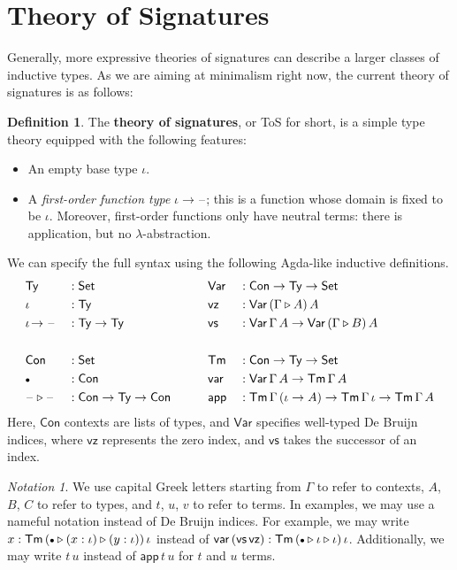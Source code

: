 \documentclass[12pt,a4paper,twoside,openany]{book}
\theoremstyle{remark}
\newtheorem{notation}{Notation}
\theoremstyle{definition}
\newtheorem{mydefinition}{Definition}
\theoremstyle{theorem}
\newcommand{\ms}[1]{\mathsf{#1}}
\newcommand{\Con}{\mathsf{Con}}
\newcommand{\Tm}{\mathsf{Tm}}
\newcommand{\Ty}{\mathsf{Ty}}
\newcommand{\blank}{\mathord{\hspace{1pt}\text{--}\hspace{1pt}}}
\newcommand{\Set}{\mathsf{Set}}
\newcommand{\ext}{\triangleright}
\newcommand{\emptycon}{\scaleobj{.75}\bullet}
\newcommand{\Var}{\ms{Var}}
\newcommand{\var}{\ms{var}}
\newcommand{\app}{\ms{app}}
\newcommand{\vz}{\ms{vz}}
\newcommand{\vs}{\ms{vs}}
\begin{document}
\section{Theory of Signatures}
\label{sec:simple-signatures}

Generally, more expressive theories of signatures can describe a larger classes
of inductive types. As we are aiming at minimalism right now, the current theory
of signatures is as follows:

\begin{mydefinition}
The \textbf{theory of signatures}, or ToS for short, is a simple type theory
equipped with the following features:
  \begin{itemize}
    \item An empty base type $\iota$.
    \item A \emph{first-order function type} $\iota\!\to\!\blank$; this is a
      function whose domain is fixed to be $\iota$. Moreover, first-order functions only
      have neutral terms: there is application, but no $\lambda$-abstraction.
  \end{itemize}
\end{mydefinition}

We can specify the full syntax using the following Agda-like inductive definitions.
\begin{alignat*}{4}
  & \Ty              &&: \Set           && \Var &&: \Con \to \Ty \to \Set \\
  & \iota            &&: \Ty            && \vz  &&: \Var\,(\Gamma \ext A)\,A \\
  & \iota\!\to\blank &&: \Ty \to \Ty    && \vs  &&: \Var\,\Gamma\,A \to \Var\,(\Gamma \ext B)\,A\\
  & && && &&\\
  & \Con             &&: \Set           && \Tm  &&: \Con \to \Ty \to \Set \\
  & \emptycon        &&: \Con           && \var &&: \Var\,\Gamma\,A \to \Tm\,\Gamma\,A \\
  & \blank\ext\blank &&: \Con \to \Ty \to \Con \hspace{2em} && \app &&: \Tm\,\Gamma\,(\iota\to A) \to \Tm\,\Gamma\,\iota
                                                           \to \Tm\,\Gamma\,A
\end{alignat*}
Here, $\Con$ contexts are lists of types, and $\Var$ specifies well-typed De Bruijn indices, where
$\vz$ represents the zero index, and $\vs$ takes the successor of an index.

\begin{notation} We use capital Greek letters starting from $\Gamma$ to refer to contexts, $A$, $B$, $C$ to
refer to types, and $t$, $u$, $v$ to refer to terms. In examples, we may use a
nameful notation instead of De Bruijn indices. For example, we may write $x :
\Tm\,(\emptycon \ext (x : \iota) \ext (y : \iota))\,\iota$ instead of $\var\,(\vs\,\vz)
: \Tm\,(\emptycon \ext \iota \ext \iota)\,\iota$. Additionally, we may write
$t\,u$ instead of $\app\,t\,u$ for $t$ and $u$ terms.
\end{notation}
\end{document}
